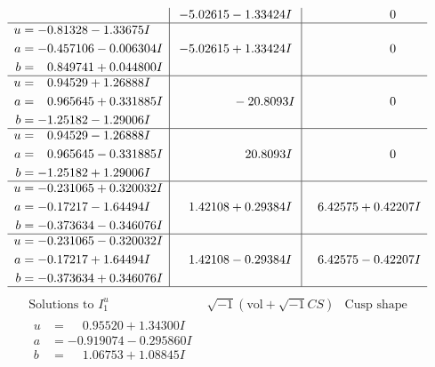 \documentclass[1p]{elsarticle_modified}
\theoremstyle{definition}
\newcommand{\I}{\sqrt{-1}}
\begin{document}
$$\begin{array}{c|c|c}
 & -5.02615 - 1.33424 I & \phantom{-0.000000 } 0 \\ \hline\begin{aligned}
u &= -0.81328 - 1.33675 I \\
a &= -0.457106 - 0.006304 I \\
b &= \phantom{-}0.849741 + 0.044800 I\end{aligned}
 & -5.02615 + 1.33424 I & \phantom{-0.000000 } 0 \\ \hline\begin{aligned}
u &= \phantom{-}0.94529 + 1.26888 I \\
a &= \phantom{-}0.965645 + 0.331885 I \\
b &= -1.25182 - 1.29006 I\end{aligned}
 & \phantom{-0.000000 } -20.8093 I & \phantom{-0.000000 } 0 \\ \hline\begin{aligned}
u &= \phantom{-}0.94529 - 1.26888 I \\
a &= \phantom{-}0.965645 - 0.331885 I \\
b &= -1.25182 + 1.29006 I\end{aligned}
 & \phantom{-0.000000 -}20.8093 I & \phantom{-0.000000 } 0 \\ \hline\begin{aligned}
u &= -0.231065 + 0.320032 I \\
a &= -0.17217 - 1.64494 I \\
b &= -0.373634 - 0.346076 I\end{aligned}
 & \phantom{-}1.42108 + 0.29384 I & \phantom{-}6.42575 + 0.42207 I \\ \hline\begin{aligned}
u &= -0.231065 - 0.320032 I \\
a &= -0.17217 + 1.64494 I \\
b &= -0.373634 + 0.346076 I\end{aligned}
 & \phantom{-}1.42108 - 0.29384 I & \phantom{-}6.42575 - 0.42207 I\\
 \hline 
 \end{array}$$\newpage$$\begin{array}{c|c|c}  
\text{Solutions to }I^u_{1}& \I (\text{vol} + \sqrt{-1}CS) & \text{Cusp shape}\\
 \hline 
\begin{aligned}
u &= \phantom{-}0.95520 + 1.34300 I \\
a &= -0.919074 - 0.295860 I \\
b &= \phantom{-}1.06753 + 1.08845 I\end{aligned}

\end{array}$$
\end{document}
